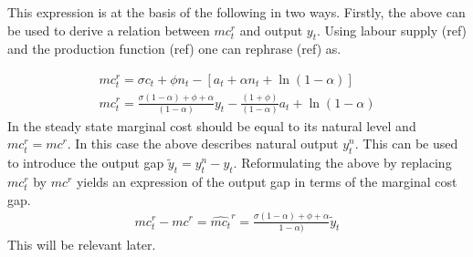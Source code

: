 \documentclass[12pt,a4paper,english]{article} %
\begin{document}
	This expression is at the basis of the following in two ways. Firstly, the above can be used to derive a relation between $mc_t^r$ and output $y_t$. Using labour supply (ref) and the production function (ref) one can rephrase (ref) as. 
	
	\begin{equation}
		\begin{aligned}
			mc_t^r = \sigma c_t + \phi n_t - [a_t + \alpha n_t + \ln(1-\alpha)] \\
			mc_t^r = 
			\frac{
				\sigma (1 - \alpha) + \phi + \alpha
			}{
				(1 - \alpha)	
			}	 y_t
			- \frac{
				(1 + \phi)	
			}{
				(1 - \alpha)	
			} a_t
			+ \ln(1-\alpha)
		\end{aligned}
	\end{equation}
	In the steady state marginal cost should be equal to its natural level and $mc_t^r = mc^r$. In this case the above describes natural output $y_t^n$. This can be used to introduce the output gap $\tilde{y}_t = y_t^n - y_t$. Reformulating the above by replacing $mc_t^r$ by $mc^r$ yields an expression of the output gap in terms of the marginal cost gap. 
	\begin{equation}
		\begin{aligned}
			mc_t^r - mc^r = \hat{mc_t}^r = \frac{\sigma (1 - \alpha) + \phi + \alpha}
			{1 - \alpha)} \tilde{y}_t
		\end{aligned}
	\end{equation}
	This will be relevant later.\\
	
\end{document}
